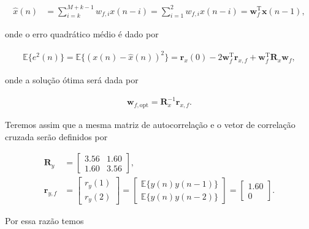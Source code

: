 \begin{enumerate}
        \begin{align}
            \hat{x}(n) &= \sum^{M + k - 1}_{i = k} w_{f,i} x(n - i) = \sum^{2}_{i = 1} w_{f,i} x(n - i) = \mathbf{w}^{\text{T}}_{f} \mathbf{x}(n - 1),
        \end{align}

        onde o erro quadrático médio é dado por

        \begin{align}
            \mathbb{E}\{e^{2}(n)\} = \mathbb{E}\{(x(n) - \hat{x}(n) )^{2}\} = \mathbf{r}_{x}(0) - 2 \mathbf{w}^{\text{T}}_{f} \mathbf{r}_{x,f} + \mathbf{w}^{\text{T}}_{f} \mathbf{R}_{x} \mathbf{w}_{f},
        \end{align}

        onde a solução ótima será dada por

        \begin{align}
            \mathbf{w}_{f,\text{opt}} = \mathbf{R}^{-1}_{x} \mathbf{r}_{x,f}.
        \end{align}

        Teremos assim que a mesma matriz de autocorrelação e o vetor de correlação cruzada serão definidos por

        \begin{align}
            \mathbf{R}_{y} &=
            \begin{bmatrix}
                3.56 & 1.60 \\
                1.60 & 3.56
            \end{bmatrix}, \\
            \mathbf{r}_{y,f} &= 
            \begin{bmatrix}
                r_{y}(1) \\
                r_{y}(2)
            \end{bmatrix} =
            \begin{bmatrix}
                \mathbb{E}\{y(n) y(n - 1)\} \\
                \mathbb{E}\{y(n) y(n - 2)\}
            \end{bmatrix} = 
            \begin{bmatrix}
                1.60 \\
                0
            \end{bmatrix}.
        \end{align}

        Por essa razão temos


\end{enumerate}
